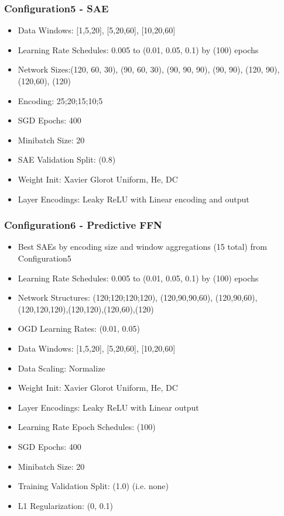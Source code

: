 \documentclass[a4paper,11pt,oneside]{article}
\theoremstyle{plain}
\theoremstyle{definition}
\begin{document}
\subsubsection{Configuration5 - SAE}\label{config5}


\begin{itemize}
	\item Data Windows: [1,5,20], [5,20,60], [10,20,60]
	\item Learning Rate Schedules: 0.005 to (0.01, 0.05, 0.1) by (100) epochs
	\item Network Sizes:(120, 60, 30), (90, 60, 30), (90, 90, 90), (90, 90), (120, 90), (120,60), (120)
	\item Encoding: 25;20;15;10;5
	\item SGD Epochs: 400
	\item Minibatch Size: 20
	\item SAE Validation Split: (0.8)
	\item Weight Init: Xavier Glorot Uniform, He, DC
	\item Layer Encodings: Leaky ReLU with Linear encoding and output
	
\end{itemize}

\subsubsection{Configuration6 - Predictive FFN}\label{config6}

\begin{itemize}
	\item Best SAEs by encoding size and window aggregations (15 total) from Configuration5
	\item Learning Rate Schedules: 0.005 to (0.01, 0.05, 0.1) by (100) epochs
	\item Network Structures: (120;120;120;120), (120,90,90,60), (120,90,60),(120,120,120),(120,120),(120,60),(120)
	\item OGD Learning Rates: (0.01, 0.05)
	\item Data Windows: [1,5,20], [5,20,60], [10,20,60]
	\item Data Scaling: Normalize
	\item Weight Init: Xavier Glorot Uniform, He, DC
	\item Layer Encodings: Leaky ReLU with Linear output
	\item Learning Rate Epoch Schedules: (100)
	\item SGD Epochs: 400
	\item Minibatch Size: 20
	\item Training Validation Split: (1.0) (i.e. none)
	\item L1 Regularization: (0, 0.1)
\end{itemize}
\end{document}
